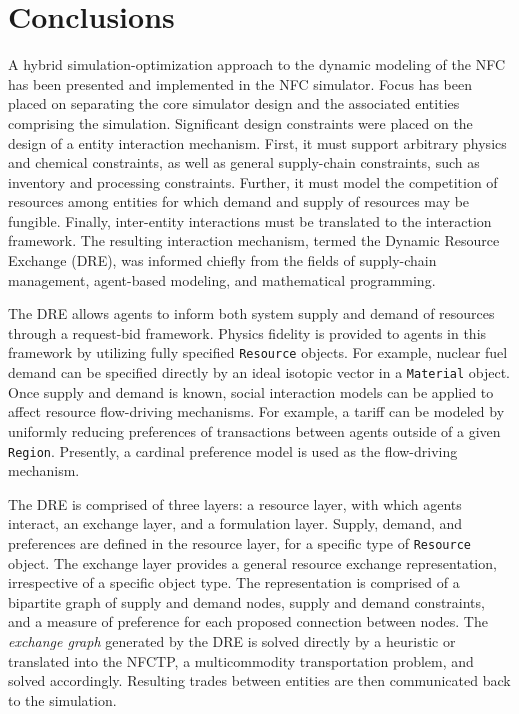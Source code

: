 \section{Conclusions}\label{sec:concl}

A hybrid simulation-optimization approach to the dynamic modeling of the NFC has
been presented and implemented in the \Cyclus NFC simulator. Focus has been
placed on separating the core simulator design and the associated entities
comprising the simulation. Significant design constraints were placed on the
design of a entity interaction mechanism. First, it must support arbitrary
physics and chemical constraints, as well as general supply-chain constraints,
such as inventory and processing constraints. Further, it must model the
competition of resources among entities for which demand and supply of resources
may be fungible. Finally, inter-entity interactions must be translated to the
interaction framework. The resulting interaction mechanism, termed the Dynamic
Resource Exchange (DRE), was informed chiefly from the fields of supply-chain
management, agent-based modeling, and mathematical programming.

The DRE allows agents to inform both system supply and demand of resources
through a request-bid framework. Physics fidelity is provided to agents in this
framework by utilizing fully specified \texttt{Resource} objects. For example,
nuclear fuel demand can be specified directly by an ideal isotopic vector in a
\texttt{Material} object. Once supply and demand is known, social interaction
models can be applied to affect resource flow-driving mechanisms. For example, a
tariff can be modeled by uniformly reducing preferences of transactions between
agents outside of a given \texttt{Region}. Presently, a cardinal preference
model is used as the flow-driving mechanism.

The DRE is comprised of three layers: a resource layer, with which agents
interact, an exchange layer, and a formulation layer. Supply, demand, and
preferences are defined in the resource layer, for a specific type of
\texttt{Resource} object. The exchange layer provides a general resource
exchange representation, irrespective of a specific object type. The
representation is comprised of a bipartite graph of supply and demand nodes,
supply and demand constraints, and a measure of preference for each proposed
connection between nodes. The \textit{exchange graph} generated by the DRE is
solved directly by a heuristic or translated into the NFCTP, a multicommodity
transportation problem, and solved accordingly. Resulting trades between
entities are then communicated back to the simulation.

